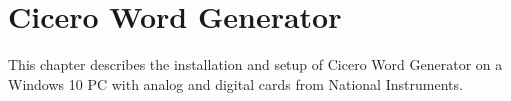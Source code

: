 
\chapter{Cicero Word Generator}\label{chap:cicero}
This chapter describes the installation and setup of Cicero Word Generator\autocite{keshet2013distributed} on a Windows 10 PC with analog and digital cards from National Instruments.
